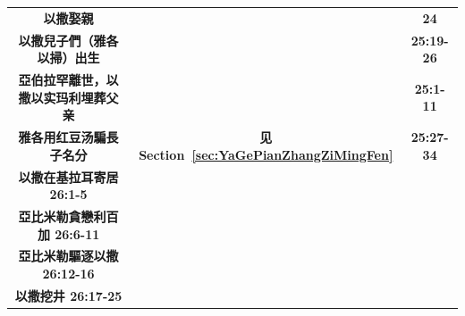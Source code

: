 \begin{table}[!hbp]
\begin{threeparttable}
\begin{tabular}{c c c}
\multicolumn{1}{L{\dimexpr0.5\linewidth-1\tabcolsep\relax}}{\bfseries 以撒娶親 }  
& \multicolumn{1}{L{\dimexpr0.2\linewidth-1\tabcolsep\relax}}{\bfseries }
& \multicolumn{1}{L{\dimexpr0.1\linewidth-1\tabcolsep\relax}}{\bfseries 24}\\ 

\multicolumn{1}{L{\dimexpr0.5\linewidth-1\tabcolsep\relax}}{\bfseries 以撒兒子們（雅各以掃）出生 }  
& \multicolumn{1}{L{\dimexpr0.2\linewidth-1\tabcolsep\relax}}{\bfseries }
& \multicolumn{1}{L{\dimexpr0.1\linewidth-1\tabcolsep\relax}}{\bfseries 25:19-26}\\ 

\multicolumn{1}{L{\dimexpr0.5\linewidth-1\tabcolsep\relax}}{\bfseries 亞伯拉罕離世，以撒以实玛利埋葬父亲}  
& \multicolumn{1}{L{\dimexpr0.2\linewidth-1\tabcolsep\relax}}{\bfseries }
& \multicolumn{1}{L{\dimexpr0.1\linewidth-1\tabcolsep\relax}}{\bfseries 25:1-11}\\ 

\multicolumn{1}{L{\dimexpr0.5\linewidth-1\tabcolsep\relax}}{\bfseries 雅各用红豆汤騙長子名分 }  
& \multicolumn{1}{L{\dimexpr0.2\linewidth-1\tabcolsep\relax}}{\bfseries 见Section~\ref{sec:YaGePianZhangZiMingFen}}
& \multicolumn{1}{L{\dimexpr0.1\linewidth-1\tabcolsep\relax}}{\bfseries 25:27-34}\\ 

\multicolumn{1}{L{\dimexpr0.5\linewidth-1\tabcolsep\relax}}{\bfseries 以撒在基拉耳寄居 26:1-5 }  
& \multicolumn{1}{L{\dimexpr0.2\linewidth-1\tabcolsep\relax}}{\bfseries }
& \multicolumn{1}{L{\dimexpr0.1\linewidth-1\tabcolsep\relax}}{\bfseries }\\ 

\multicolumn{1}{L{\dimexpr0.5\linewidth-1\tabcolsep\relax}}{\bfseries 亞比米勒貪戀利百加 26:6-11}  
& \multicolumn{1}{L{\dimexpr0.2\linewidth-1\tabcolsep\relax}}{\bfseries }
& \multicolumn{1}{L{\dimexpr0.1\linewidth-1\tabcolsep\relax}}{\bfseries }\\ 

\multicolumn{1}{L{\dimexpr0.5\linewidth-1\tabcolsep\relax}}{\bfseries 亞比米勒驅逐以撒 26:12-16}  
& \multicolumn{1}{L{\dimexpr0.2\linewidth-1\tabcolsep\relax}}{\bfseries }
& \multicolumn{1}{L{\dimexpr0.1\linewidth-1\tabcolsep\relax}}{\bfseries }\\ 

\multicolumn{1}{L{\dimexpr0.5\linewidth-1\tabcolsep\relax}}{\bfseries 以撒挖井 26:17-25}  
& \multicolumn{1}{L{\dimexpr0.2\linewidth-1\tabcolsep\relax}}{\bfseries }
& \multicolumn{1}{L{\dimexpr0.1\linewidth-1\tabcolsep\relax}}{\bfseries }\\ 


\end{tabular}
\end{threeparttable}
\end{table}
